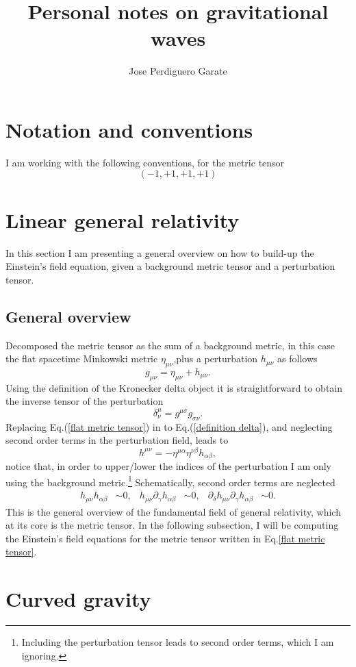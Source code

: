 \documentclass{article}
\title{Personal notes on gravitational waves}
\author{Jose Perdiguero Garate}
\begin{document}
\maketitle
\tableofcontents

\section*{Notation and conventions}

I am working with the following conventions, for the metric tensor
\begin{equation}
    \left(-1, +1, +1, +1\right)
\end{equation}

\section{Linear general relativity}

In this section I am presenting a general overview on how to build-up
the Einstein's field equation, given a background metric tensor and a 
perturbation tensor.

\subsection{General overview}

Decomposed the metric tensor as the sum of a background metric, in this case 
the flat spacetime Minkowski metric $\eta_{\mu\nu}$,plus a perturbation 
$h_{\mu\nu}$ as follows
\begin{equation}
    \label{flat metric tensor}
    g_{\mu\nu} =  \eta_{\mu\nu} + h_{\mu\nu}.
\end{equation}
Using the definition of the Kronecker delta object it is straightforward to
obtain the inverse tensor of the perturbation
\begin{equation}
    \label{definition delta}
    \delta^{\mu}_{\nu} = g^{\mu\sigma}g_{\sigma\nu}.
\end{equation}
Replacing Eq.(\ref{flat metric tensor}) in to Eq.(\ref{definition delta}), and
neglecting second order terms in the perturbation field, leads to
\begin{equation}
    h^{\mu\nu} = -\eta^{\mu\alpha}\eta^{\nu\beta}h_{\alpha\beta},
\end{equation}
notice that, in order to upper/lower the indices of the perturbation I am only
using the background metric.\footnote{Including the perturbation tensor leads
to second order terms, which I am ignoring.} Schematically, second order terms
are neglected 
\begin{align}
    h_{\mu\nu}h_{\alpha\beta} & \sim 0, & 
    h_{\mu\nu}\partial_{\gamma} h_{\alpha\beta} & \sim 0, &
    \partial_{\delta} h_{\mu\nu}\partial_\gamma h_{\alpha\beta} & \sim 0.
\end{align}
This is the general overview of the fundamental field of general relativity,
which at its core is the metric tensor. In the following subsection, I will
be computing the Einstein's field equations for the metric tensor written 
in Eq.\ref{flat metric tensor}.

\section{Curved gravity}
\end{document}
